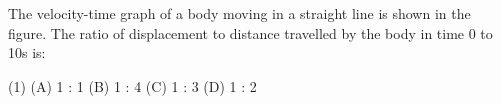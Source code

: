 \item The velocity-time graph of a body moving in a straight line is shown in the figure. The ratio of displacement to distance travelled by the body in time 0 to 10s is:
    \begin{center}
    \end{center}
    \begin{tasks}(1)
        \task (A) 1 : 1
        \task (B) 1 : 4
        \task (C) 1 : 3
        \task (D) 1 : 2
    \end{tasks}